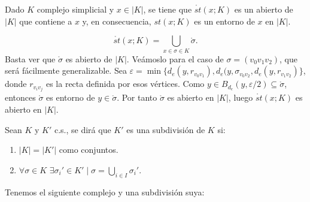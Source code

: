 \documentclass[HS.tex]{subfiles}
\begin{document}
\begin{prop}
Dado $K$ complejo simplicial y $x\in|K|$, se tiene que $\mathring{st}(x;K)$ es un abierto de $|K|$ que contiene a $x$ y, en consecuencia, $st(x;K)$ es un entorno de $x$ en $|K|$.
\end{prop}
\begin{dem}
\[
\mathring{st}(x;K)=\bigcup_{x\in \sigma\in K}\mathring{\sigma}.
\]
Basta ver que $\mathring{\sigma}$ es abierto de $|K|$. Veámoslo para el caso de $\sigma=(v_0v_1v_2)$, que será fácilmente generalizable. Sea $\varepsilon=\min\{d_e(y,r_{v_0v_1}),d_e(y,\sigma_{v_0v_2},d_e(y,r_{v_1v_2})\}$, donde $r_{v_iv_j}$ es la recta definida por esos vértices. Como $y\in B_{d_e}(y,\varepsilon/2)\subseteq \mathring{\sigma}$, entonces $\mathring{\sigma}$ es entorno de $y\in\mathring{\sigma}$. Por tanto $\mathring{\sigma}$ es abierto en $|K|$, luego $\mathring{st}(x;K)$ es abierto en $|K|$. 
\QED
\end{dem}

\begin{defi}
Sean $K$ y $K'$ c.s., se dirá que $K'$ es una subdivisión de $K$ si:
\begin{enumerate}
	\item $|K|=|K'|$ como conjuntos.
	\item $\forall σ \in K$ $\exists σ_i' \in K' \mid σ = \bigcup_{i\in I} σ_i'$.
\end{enumerate}
\end{defi}

\begin{ej}
Tenemos el siguiente complejo y una subdivisión suya:

\begin{figure}[H]
\centering
{}
\end{figure}
\end{ej}
\end{document}
